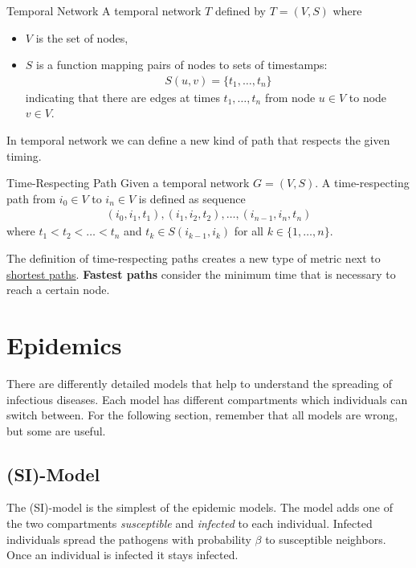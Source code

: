 \documentclass[english]{panikzettel}
\begin{document}
\begin{defi}{Temporal Network}
A temporal network $ T $ defined by $ T = (V,S) $ where
\begin{itemize}
	\item $ V $ is the set of nodes,
	\item $ S $ is a function mapping pairs of nodes to sets of timestamps:
\begin{align*}
	S(u,v) = \{t_1, \dots, t_n\}
\end{align*}
indicating that there are edges at times $ t_1, \dots, t_n $ from node $ u \in V $ to node $ v \in V $.
\end{itemize}
\end{defi}

In temporal network we can define a new kind of path that respects the given timing.

\begin{defi}{Time-Respecting Path}
Given a temporal network $ G = (V,S) $.
A time-respecting path from $ i_0 \in V $ to $ i_n \in V $ is defined as sequence
\begin{align*}
	(i_0,i_1,t_1), (i_1,i_2,t_2), \dots, (i_{n-1}, i_n,t_n)
\end{align*}
where $ t_1 < t_2 < \dots < t_n $ and $ t_k \in S(i_{k-1},i_k) $ for all $ k \in \{1, \dots, n\} $.
\end{defi}

The definition of time-respecting paths creates a new type of metric next to \hyperref[sec:distance]{shortest paths}.
\textbf{Fastest paths} consider the minimum time that is necessary to reach a certain node.

\section{Epidemics}
There are differently detailed models that help to understand the spreading of infectious diseases.
Each model has different compartments which individuals can switch between.
For the following section, remember that all models are wrong, but some are useful.

\subsection{(SI)-Model}
The (SI)-model is the simplest of the epidemic models.
The model adds one of the two compartments \textit{susceptible} and \textit{infected} to each individual.
Infected individuals spread the pathogens with probability $ \beta $ to susceptible neighbors.
Once an individual is infected it stays infected.
\end{document}
